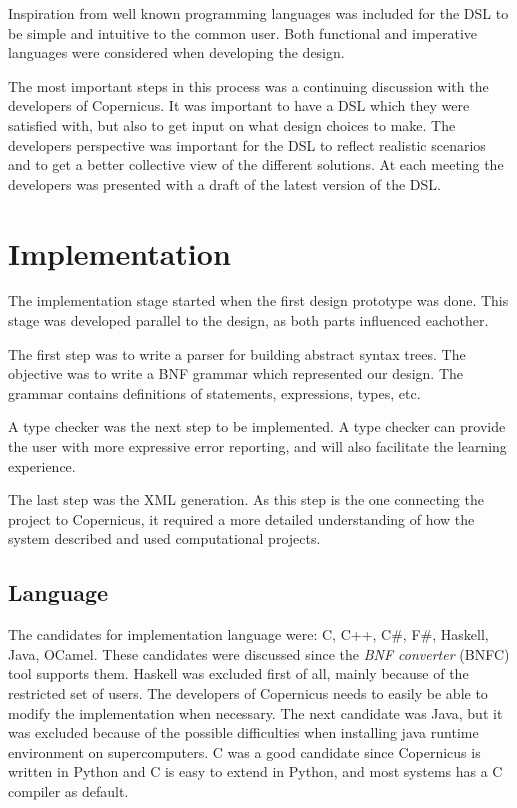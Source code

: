Inspiration from well known programming languages was included for the
DSL to be simple and intuitive to the common user. Both functional and
imperative languages were considered when developing the design.

The most important steps in this process was a continuing discussion
with the developers of Copernicus. It was important to have a DSL
which they were satisfied with, but also to get input on what design
choices to make. The developers perspective was important for the DSL
to reflect realistic scenarios and to get a better collective view of
the different solutions. At each meeting the developers was presented
with a draft of the latest version of the DSL.


\section{Implementation}
The implementation stage started when the first design prototype was
done. This stage was developed parallel to the design, as both parts
influenced eachother.

The first step was to write a parser for building abstract syntax
trees. The objective was to write a BNF grammar which represented our
design. The grammar contains definitions of statements, expressions,
types, etc.

A type checker was the next step to be implemented. A type checker can
provide the user with more expressive error reporting, and will also
facilitate the learning experience.

The last step was the XML generation. As this step is the one
connecting the project to Copernicus, it required a more detailed
understanding of how the system described and used computational
projects.


\subsection{Language}
The candidates for implementation language were: C, C++, C\#, F\#,
Haskell, Java, OCamel. These candidates were discussed since the
\emph{BNF converter} (BNFC) tool supports them. \citep{bnfc:online}
Haskell was excluded first of all, mainly because of the restricted
set of users. The developers of Copernicus needs to easily be able to
modify the implementation when necessary. The next candidate was Java,
but it was excluded because of the possible difficulties when
installing java runtime environment on supercomputers. C was a good
candidate since Copernicus is written in Python and C is easy to
extend in Python, and most systems has a C compiler as default.

